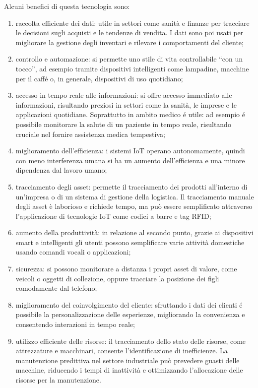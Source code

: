\noindent Alcuni benefici di questa tecnologia sono\cite{iot-vantaggi}: \begin{enumerate}
    \item raccolta efficiente dei dati: utile in settori come sanità e finanze per tracciare le decisioni sugli acquisti e le tendenze di vendita. I dati sono poi usati per migliorare la gestione degli inventari e rilevare i comportamenti del cliente;
    \item controllo e automazione: si permette uno stile di vita controllabile ``con un tocco'', ad esempio tramite dispositivi intelligenti come lampadine, macchine per il caffé o, in generale, dispositivi di uso quotidiano;
    \item accesso in tempo reale alle informazioni: si offre accesso immediato alle informazioni, risultando preziosi in settori come la sanità, le imprese e le applicazioni quotidiane. Soprattutto in ambito medico é utile: ad esempio é possibile monitorare la salute di un paziente in tempo reale, risultando cruciale nel fornire assistenza medica tempestiva;
    \item miglioramento dell'efficienza: i sistemi IoT operano autonomamente, quindi con meno interferenza umana si ha un aumento dell'efficienza e una minore dipendenza dal lavoro umano;
    \item tracciamento degli asset: permette il tracciamento dei prodotti all'interno di un'impresa o di un sistema di gestione della logistica. Il tracciamento manuale degli asset è laborioso e richiede tempo, ma può essere semplificato attraverso l'applicazione di tecnologie IoT come codici a barre e tag RFID;
    \item aumento della produttività: in relazione al secondo punto, grazie ai dispositivi smart e intelligenti gli utenti possono semplificare varie attività domestiche usando comandi vocali o applicazioni;
    \item sicurezza: si possono monitorare a distanza i propri asset di valore, come veicoli o oggetti di collezione, oppure tracciare la posizione dei figli comodamente dal telefono;
    \item miglioramento del coinvolgimento del cliente: sfruttando i dati dei clienti é possibile la personalizzazione delle esperienze, migliorando la convenienza e consentendo interazioni in tempo reale;
    \item utilizzo efficiente delle risorse: il tracciamento dello stato delle risorse, come attrezzature e macchinari, consente l'identificazione di inefficienze. La manutenzione predittiva nel settore industriale può prevedere guasti delle macchine, riducendo i tempi di inattività e ottimizzando l'allocazione delle risorse per la manutenzione.
\end{enumerate}

